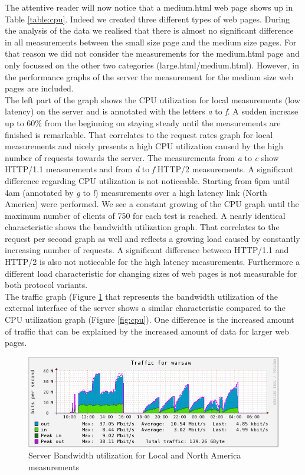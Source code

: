 The attentive reader will now  notice that a medium.html web page shows up in Table \ref{table:cpu}. Indeed we created three different types of web pages. During the analysis of the data we realised that there is almost no significant difference in all measurements between the small size page and the medium size pages. For that reason we did not consider the measurements for the medium.html page and only focussed on the other two categories (large.html/medium.html). However, in the performance graphs of the server the measurement for the medium size web pages are included.
\\ 
The left part of the graph shows the CPU utilization for local measurements (low latency) on the server and is annotated with the letters \textit{a} to \textit{f}. A sudden increase up to 60\% from the beginning on staying steady until the measurements are finished is remarkable. That correlates to the request rates graph for local measurements and nicely presents a high CPU utilization caused by the high number of requests towards the server. The measurements from \textit{a} to \textit{c} show HTTP/1.1 measurements and from \textit{d} to \textit{f} HTTP/2 measurements. A significant difference regarding CPU utilization is not noticeable. Starting from 6pm until 4am (annotated by \textit{g} to \textit{l}) measurements over a high latency link (North America) were performed. We see a constant growing of the CPU graph until the maximum number of clients of 750 for each test is reached. A nearly identical characteristic shows the bandwidth utilization graph. That correlates to the request per second graph as well and reflects a growing load caused by constantly increasing number of requests. A significant difference between HTTP/1.1 and HTTP/2 is also not noticeable for the high latency measurements. Furthermore a different load characteristic for changing sizes of web pages is not measurable for both protocol variants. 
\\
The traffic graph (Figure \ref{fig:network} that represents the bandwidth utilization of the external interface of the server shows a similar characteristic compared to the CPU utilization graph (Figure \ref{fig:cpu}). One difference is the increased amount of traffic that can be explained by the increased amount of data for larger web pages. 

\begin{figure}[H]
\centering
\includegraphics[scale=0.6,trim=0.0cm .0cm .0cm .0cm,clip]{images/network.png}
\caption{Server Bandwidth utilization for Local and North America measurements}
\label{fig:network}
\end{figure}

